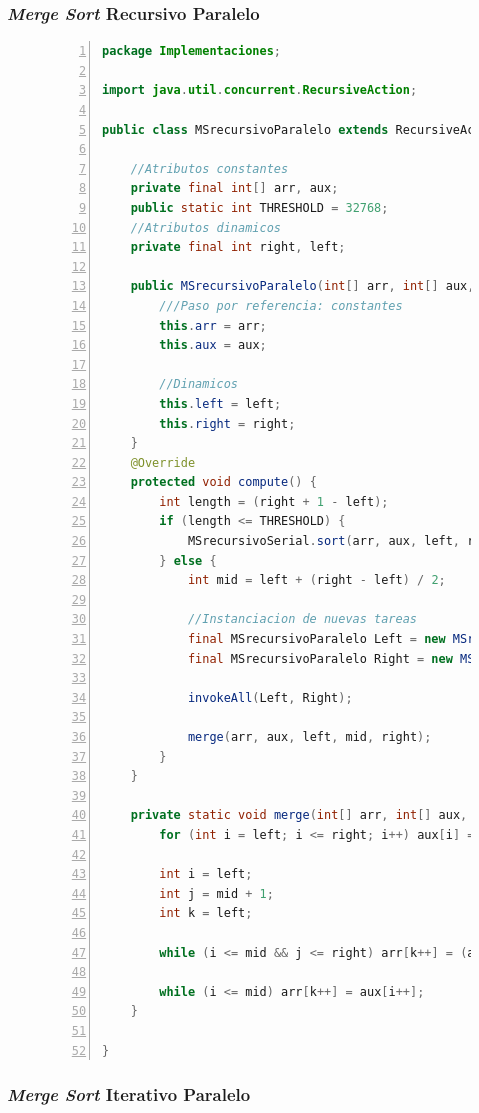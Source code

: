 \documentclass[titlepage]{article}
\begin{document}
\subsubsection{\textit{Merge Sort} Recursivo Paralelo}
\begin{figure}[h]
	\begin{lstlisting}[language=java, frame=single, numbers=left]
package Implementaciones;

import java.util.concurrent.RecursiveAction;

public class MSrecursivoParalelo extends RecursiveAction {
	
	//Atributos constantes
	private final int[] arr, aux;
	public static int THRESHOLD = 32768;
	//Atributos dinamicos
	private final int right, left;
	
	public MSrecursivoParalelo(int[] arr, int[] aux, int left, int right){
		///Paso por referencia: constantes
		this.arr = arr;
		this.aux = aux;
		
		//Dinamicos
		this.left = left;
		this.right = right;
	}
	@Override
	protected void compute() {
		int length = (right + 1 - left);
		if (length <= THRESHOLD) {
			MSrecursivoSerial.sort(arr, aux, left, right);
		} else {
			int mid = left + (right - left) / 2;
			
			//Instanciacion de nuevas tareas
			final MSrecursivoParalelo Left = new MSrecursivoParalelo(arr, aux, left, mid);
			final MSrecursivoParalelo Right = new MSrecursivoParalelo(arr, aux, mid+1, right);
			
			invokeAll(Left, Right);
			
			merge(arr, aux, left, mid, right);
		}
	}
	
	private static void merge(int[] arr, int[] aux, int left, int mid, int right) {
		for (int i = left; i <= right; i++) aux[i] = arr[i];
		
		int i = left;       
		int j = mid + 1;    
		int k = left;       
		
		while (i <= mid && j <= right) arr[k++] = (aux[i] <= aux[j])? aux[i++] : aux[j++];
		
		while (i <= mid) arr[k++] = aux[i++];
	}
	
}
	\end{lstlisting}
\end{figure}

\subsubsection{\textit{Merge Sort} Iterativo Paralelo}
\end{document}
